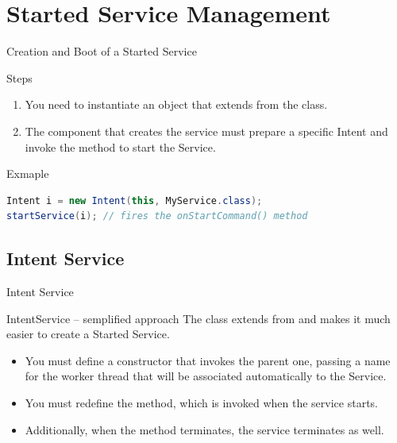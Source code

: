 \documentclass{beamer}
\begin{document}
\section{Started Service Management}
  \begin{frame}[fragile]{Creation and Boot of a Started Service}
    \begin{block}{Steps}
      \begin{enumerate}\itemsep10pt
        \item You need to instantiate an object that extends from the
         class.
        \item The component that creates the service must prepare a specific
        Intent and invoke the  method to start the
        Service.
      \end{enumerate}
    \end{block}
    \begin{exampleblock}{Exmaple}
      \begin{lstlisting}[language=Java]  		        
Intent i = new Intent(this, MyService.class);
startService(i); // fires the onStartCommand() method
      \end{lstlisting}
    \end{exampleblock}
  \end{frame}

\subsection{Intent Service}
  \begin{frame}{Intent Service}
    \begin{block}{IntentService -- semplified approach}
      The  class extends from  and
      makes it much easier to create a Started Service.
      \begin{itemize}\itemsep10pt
        \item You must define a constructor that invokes the parent one, passing a
        name for the worker thread that will be associated automatically to the
        Service.
        \item You must redefine the  method, which
        is invoked when the service starts.
        \item Additionally, when the method terminates, the service terminates as well.
      \end{itemize}
    \end{block}
  \end{frame}
\end{document}
